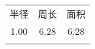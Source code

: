 \begin{tabular}{|c||cc|}
\hhline{|=:t:==|}
半径 & 周长 & 面积 \\
\hhline{|=::==|}
1.00 & 6.28 & 6.28 \\
\hhline{|=:b:==|}
\end{tabular}
